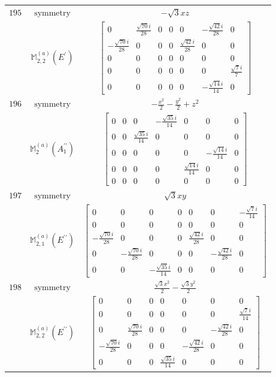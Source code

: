 \documentclass[fleqn,8pt,landscape]{jsarticle}
\begin{document}
\begin{longtable}{ccc}
$ 195 $ & $ \text{symmetry} $ & $ - \sqrt{3} x z $ \\
$  $ & $ \mathbb{M}_{2,2}^{(a)}(E^{\prime}) $ & $ \begin{bmatrix} 0 & \frac{\sqrt{70} i}{28} & 0 & 0 & 0 & - \frac{\sqrt{42} i}{28} & 0 \\ - \frac{\sqrt{70} i}{28} & 0 & 0 & 0 & \frac{\sqrt{42} i}{28} & 0 & 0 \\ 0 & 0 & 0 & 0 & 0 & 0 & 0 \\ 0 & 0 & 0 & 0 & 0 & 0 & \frac{\sqrt{7} i}{7} \\ 0 & 0 & 0 & 0 & 0 & - \frac{\sqrt{14} i}{14} & 0 \end{bmatrix} $ \\ \hline
$ 196 $ & $ \text{symmetry} $ & $ - \frac{x^{2}}{2} - \frac{y^{2}}{2} + z^{2} $ \\
$  $ & $ \mathbb{M}_{2}^{(a)}(A_{1}^{\prime\prime}) $ & $ \begin{bmatrix} 0 & 0 & 0 & - \frac{\sqrt{35} i}{14} & 0 & 0 & 0 \\ 0 & 0 & \frac{\sqrt{35} i}{14} & 0 & 0 & 0 & 0 \\ 0 & 0 & 0 & 0 & 0 & - \frac{\sqrt{14} i}{14} & 0 \\ 0 & 0 & 0 & 0 & \frac{\sqrt{14} i}{14} & 0 & 0 \\ 0 & 0 & 0 & 0 & 0 & 0 & 0 \end{bmatrix} $ \\ \hline
$ 197 $ & $ \text{symmetry} $ & $ \sqrt{3} x y $ \\
$  $ & $ \mathbb{M}_{2,1}^{(a)}(E^{\prime\prime}) $ & $ \begin{bmatrix} 0 & 0 & 0 & 0 & 0 & 0 & - \frac{\sqrt{7} i}{14} \\ 0 & 0 & 0 & 0 & 0 & 0 & 0 \\ - \frac{\sqrt{70} i}{28} & 0 & 0 & 0 & \frac{\sqrt{42} i}{28} & 0 & 0 \\ 0 & - \frac{\sqrt{70} i}{28} & 0 & 0 & 0 & - \frac{\sqrt{42} i}{28} & 0 \\ 0 & 0 & - \frac{\sqrt{35} i}{14} & 0 & 0 & 0 & 0 \end{bmatrix} $ \\ \hline
$ 198 $ & $ \text{symmetry} $ & $ \frac{\sqrt{3} x^{2}}{2} - \frac{\sqrt{3} y^{2}}{2} $ \\
$  $ & $ \mathbb{M}_{2,2}^{(a)}(E^{\prime\prime}) $ & $ \begin{bmatrix} 0 & 0 & 0 & 0 & 0 & 0 & 0 \\ 0 & 0 & 0 & 0 & 0 & 0 & \frac{\sqrt{7} i}{14} \\ 0 & \frac{\sqrt{70} i}{28} & 0 & 0 & 0 & - \frac{\sqrt{42} i}{28} & 0 \\ - \frac{\sqrt{70} i}{28} & 0 & 0 & 0 & - \frac{\sqrt{42} i}{28} & 0 & 0 \\ 0 & 0 & 0 & \frac{\sqrt{35} i}{14} & 0 & 0 & 0 \end{bmatrix} $ \\ \hline

\end{longtable}
\end{document}
